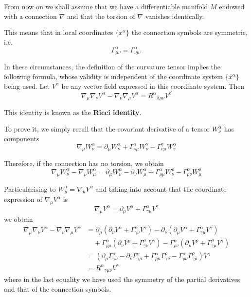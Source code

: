 \begin{points}
\item From now on we shall assume that we have a differentiable manifold $M$ endowed with a connection $\nabla$ and that the torsion of $\nabla$ vanishes identically.

\item This means that in local coordinates $\{x^\alpha\}$ the connection symbols are symmetric, i.e.
\[
  \Gamma^\alpha_{\mu\nu}=\Gamma^\alpha_{\nu\mu} .
\]

\item In these circumstances, the definition of the curvature tensor implies the following formula, whose validity is independent of the coordinate system $\{x^\alpha\}$ being used. Let $V^\alpha$ be any vector field expressed in this coordinate system. Then
\[
  \nabla_\mu\nabla_\nu V^\alpha-\nabla_\nu\nabla_\mu V^\alpha=R^\alpha{}_{\beta\mu\nu}V^\beta
\]

\item This identity is known as the \textbf{Ricci identity}.

\item To prove it, we simply recall that the covariant derivative of a tensor $W^\alpha_\nu$ has components
\[
  \nabla_\mu W^\alpha_\nu=\partial_\mu W^\alpha_\nu+\Gamma^\alpha_{\gamma\mu}W^\gamma_\nu-\Gamma^\gamma_{\nu\mu}W^\alpha_\gamma
\]

\item Therefore, if the connection has no torsion, we obtain
\[
  \nabla_\mu W^\alpha_\nu-\nabla_\nu W^\alpha_\mu=\partial_\mu W^\alpha_\nu-\partial_\nu W^\alpha_\mu+\Gamma^\alpha_{\rho\mu}W^\rho_\nu-\Gamma^\alpha_{\rho\nu}W^\rho_\mu
\]

\item Particularising to $W^\alpha_\mu=\nabla_\mu V^\alpha$ and taking into account that the coordinate expression of $\nabla_\mu V^\alpha$ is
\[
  \nabla_\mu V^\alpha=\partial_\mu V^\alpha+\Gamma^\alpha_{\gamma\mu}V^\gamma
\]
we obtain
\begin{align*}
  \nabla_\mu\nabla_\nu V^\alpha-\nabla_\nu\nabla_\mu V^\alpha&=\partial_\mu\left(\partial_\nu V^\alpha+\Gamma^\alpha_{\gamma\nu}V^\gamma\right)-\partial_\nu\left(\partial_\mu V^\alpha+\Gamma^\alpha_{\gamma\mu}V^\gamma\right)\\
  &\quad+\Gamma^\alpha_{\rho\mu}\left(\partial_\nu V^\rho+\Gamma^\rho_{\gamma\nu}V^\gamma\right)-\Gamma^\alpha_{\rho\nu}\left(\partial_\mu V^\rho+\Gamma^\rho_{\gamma\mu}V^\gamma\right)\\
  &=\left(\partial_\mu\Gamma^\alpha_{\gamma\nu}-\partial_\nu\Gamma^\alpha_{\gamma\mu}+\Gamma^\alpha_{\rho\mu}\Gamma^\rho_{\gamma\nu}-\Gamma^\alpha_{\rho\nu}\Gamma^\rho_{\gamma\mu}\right)V^\gamma\\
  &=R^\alpha{}_{\gamma\mu\nu}V^\gamma
\end{align*}
where in the last equality we have used the symmetry of the partial derivatives and that of the connection symbols.


\end{points}

